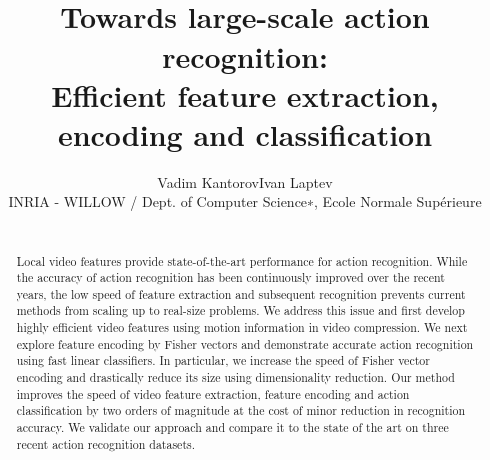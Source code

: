 \documentclass[10pt,twocolumn,letterpaper]{article}
\begin{document}

\title{\mbox{}\vspace{-1cm}\\Towards large-scale action recognition: \\ Efficient feature extraction, encoding and classification\vspace{-.2cm}\\}

\author{Vadim Kantorov\qquad Ivan Laptev\\INRIA - WILLOW / Dept. of Computer Science∗, Ecole Normale Supérieure}

\maketitle

\begin{abstract}

\mbox{}\vspace{-.6cm}\\
Local video features provide state-of-the-art performance for action recognition. While the accuracy of action recognition has been continuously improved over the recent years, the low speed of feature extraction and subsequent recognition prevents current methods from scaling up to real-size problems. We address this issue and first develop highly efficient video features using motion information in video compression. We next explore feature encoding by Fisher vectors and demonstrate accurate action recognition using fast linear classifiers. In particular, we increase the speed of Fisher vector encoding and drastically reduce its size using dimensionality reduction. Our method improves the speed of video feature extraction, feature encoding and action classification by two orders of magnitude at the cost of minor reduction in recognition accuracy. We validate our approach and compare it to the state of the art on three recent action recognition datasets.

\end{abstract}
\end{document}
